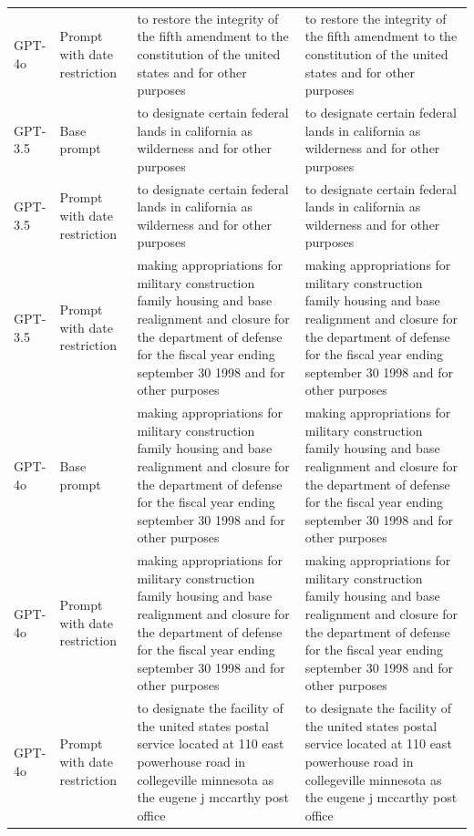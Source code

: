 \begin{longtable}{>{\raggedright\arraybackslash}p{1.4cm}>{\raggedright\arraybackslash}p{1.4cm}>{\raggedright\arraybackslash}p{5.5cm}>{\raggedright\arraybackslash}p{5.5cm}}
GPT-4o & Prompt with date restriction & to restore the integrity of the fifth amendment to the constitution of the united states and for other purposes & to restore the integrity of the fifth amendment to the constitution of the united states and for other purposes\\
GPT-3.5 & Base prompt & to designate certain federal lands in california as wilderness and for other purposes & to designate certain federal lands in california as wilderness and for other purposes\\
GPT-3.5 & Prompt with date restriction & to designate certain federal lands in california as wilderness and for other purposes & to designate certain federal lands in california as wilderness and for other purposes\\
GPT-3.5 & Prompt with date restriction & making appropriations for military construction family housing and base realignment and closure for the department of defense for the fiscal year ending september 30 1998 and for other purposes & making appropriations for military construction family housing and base realignment and closure for the department of defense for the fiscal year ending september 30 1998 and for other purposes\\
GPT-4o & Base prompt & making appropriations for military construction family housing and base realignment and closure for the department of defense for the fiscal year ending september 30 1998 and for other purposes & making appropriations for military construction family housing and base realignment and closure for the department of defense for the fiscal year ending september 30 1998 and for other purposes\\
GPT-4o & Prompt with date restriction & making appropriations for military construction family housing and base realignment and closure for the department of defense for the fiscal year ending september 30 1998 and for other purposes & making appropriations for military construction family housing and base realignment and closure for the department of defense for the fiscal year ending september 30 1998 and for other purposes\\
GPT-4o & Prompt with date restriction & to designate the facility of the united states postal service located at 110 east powerhouse road in collegeville minnesota as the eugene j mccarthy post office & to designate the facility of the united states postal service located at 110 east powerhouse road in collegeville minnesota as the eugene j mccarthy post office\\

\end{longtable}
